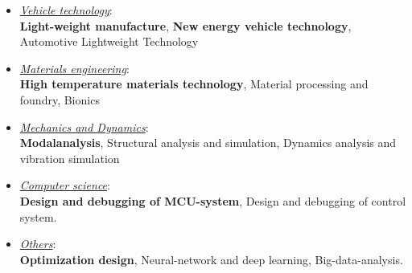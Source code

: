 \documentclass{resume}
\begin{document}
\begin{itemize}
	\setlength{\itemsep}{4pt}

	\item {\large \textit{\underline{Vehicle technology}}\hspace{1mm}:}\\[1.5mm]
	{\large \textbf{Light-weight manufacture}, \hspace{1mm} \textbf{New energy vehicle technology}, \hspace{1mm} Automotive
		Lightweight Technology}
	
	\item {\large \textit{\underline{Materials engineering}}\hspace{1mm}:}\\[1.5mm]
	{\large \textbf{High temperature materials technology}, \hspace{1mm} Material processing and foundry, \hspace{1mm} Bionics}
	
	\item {\large \textit{\underline{Mechanics and Dynamics}}\hspace{1mm}:} \\[1.5mm]
	{\large \textbf{Modalanalysis},\hspace{1mm} Structural analysis and simulation,\hspace{1mm} Dynamics analysis and vibration simulation}
	
	\item {\large \textit{\underline{Computer science}}\hspace{1mm}:} \\[1.5mm]
	{\large \textbf{Design and debugging of MCU-system}, Design and debugging of control system.}
	
	\item {\large \textit{\underline{Others}}\hspace{1mm}:} \\[1.5mm]
	{\large \textbf{Optimization design},\hspace{1mm} Neural-network and deep learning, \hspace{1mm} Big-data-analysis.}
	
\end{itemize}
\end{document}
